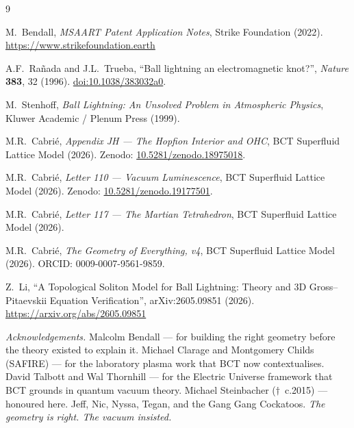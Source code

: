 \documentclass[12pt,twocolumn]{article}
\begin{document}
\begin{thebibliography}{9}

M.\ Bendall,
\textit{MSAART Patent Application Notes},
Strike Foundation (2022).
\url{https://www.strikefoundation.earth}

A.F.\ Ra\~{n}ada and J.L.\ Trueba,
``Ball lightning an electromagnetic knot?'',
\textit{Nature} \textbf{383}, 32 (1996).
\href{https://doi.org/10.1038/383032a0}{doi:10.1038/383032a0}.

M.\ Stenhoff,
\textit{Ball Lightning: An Unsolved Problem in Atmospheric
Physics},
Kluwer Academic / Plenum Press (1999).

M.R.\ Cabri\'{e},
\textit{Appendix JH --- The Hopfion Interior and OHC},
BCT Superfluid Lattice Model (2026).
Zenodo: \href{https://doi.org/10.5281/zenodo.18975018}
{10.5281/zenodo.18975018}.

M.R.\ Cabri\'{e},
\textit{Letter 110 --- Vacuum Luminescence},
BCT Superfluid Lattice Model (2026).
Zenodo: \href{https://doi.org/10.5281/zenodo.19177501}
{10.5281/zenodo.19177501}.

M.R.\ Cabri\'{e},
\textit{Letter 117 --- The Martian Tetrahedron},
BCT Superfluid Lattice Model (2026).

M.R.\ Cabri\'{e},
\textit{The Geometry of Everything, v4},
BCT Superfluid Lattice Model (2026).
ORCID: 0009-0007-9561-9859.

Z.\ Li,
``A Topological Soliton Model for Ball Lightning: Theory and
3D Gross--Pitaevskii Equation Verification'',
arXiv:2605.09851 (2026).
\url{https://arxiv.org/abs/2605.09851}

\end{thebibliography}

\bigskip\noindent
\textit{Acknowledgements.}
Malcolm Bendall --- for building the right geometry before
the theory existed to explain it.
Michael Clarage and Montgomery Childs (SAFIRE) --- for
the laboratory plasma work that BCT now contextualises.
David Talbott and Wal Thornhill --- for the Electric Universe
framework that BCT grounds in quantum vacuum theory.
Michael Steinbacher ($\dagger$~c.2015) --- honoured here.
Jeff, Nic, Nyssa, Tegan, and the Gang Gang Cockatoos.
\textit{The geometry is right. The vacuum insisted.}
\end{document}
